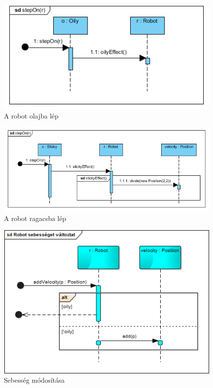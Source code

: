 \begin{figure}[!htbp]
	\begin{center}
		\includegraphics[width=166mm, center]{./vegleges_statikus_seq/steponoily.png}
		\caption{A robot olajba lép}
	\end{center}
\end{figure}

\begin{figure}[!htbp]
	\begin{center}
		\includegraphics[width=166mm, center]{./vegleges_statikus_seq/steponsticky.png}
		\caption{A robot ragacsba lép}
	\end{center}
\end{figure}

\begin{figure}[!htbp]
	\begin{center}
		\includegraphics[width=166mm, center]{./vegleges_statikus_seq/robot_change_velocity.png}
		\caption{Sebesség módosítása}
	\end{center}
\end{figure}


